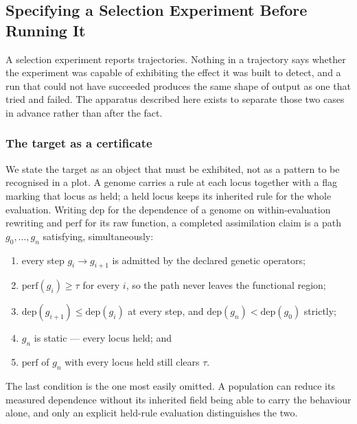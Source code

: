 \documentclass[man,12pt,floatsintext,donotrepeattitle]{apa7}
\begin{document}
\subsection*{Specifying a Selection Experiment Before Running It}
\label{sec:apparatus}

A selection experiment reports trajectories. Nothing in a trajectory says whether
the experiment was capable of exhibiting the effect it was built to detect, and a
run that could not have succeeded produces the same shape of output as one that
tried and failed. The apparatus described here exists to separate those two cases
in advance rather than after the fact.

\subsubsection*{The target as a certificate}

We state the target as an object that must be exhibited, not as a pattern to be
recognised in a plot. A genome carries a rule at each locus together with a flag
marking that locus as held; a held locus keeps its inherited rule for the whole
evaluation. Writing $\mathrm{dep}$ for the dependence of a genome on
within-evaluation rewriting and $\mathrm{perf}$ for its raw function, a completed
assimilation claim is a path $g_0,\dots,g_n$ satisfying, simultaneously:

\begin{enumerate}
\item every step $g_i \to g_{i+1}$ is admitted by the declared genetic operators;
\item $\mathrm{perf}(g_i) \ge \tau$ for every $i$, so the path never leaves the
      functional region;
\item $\mathrm{dep}(g_{i+1}) \le \mathrm{dep}(g_i)$ at every step, and
      $\mathrm{dep}(g_n) < \mathrm{dep}(g_0)$ strictly;
\item $g_n$ is static --- every locus held; and
\item $\mathrm{perf}$ of $g_n$ with every locus held still clears $\tau$.
\end{enumerate}

The last condition is the one most easily omitted. A population can reduce its
measured dependence without its inherited field being able to carry the behaviour
alone, and only an explicit held-rule evaluation distinguishes the two.
\end{document}
